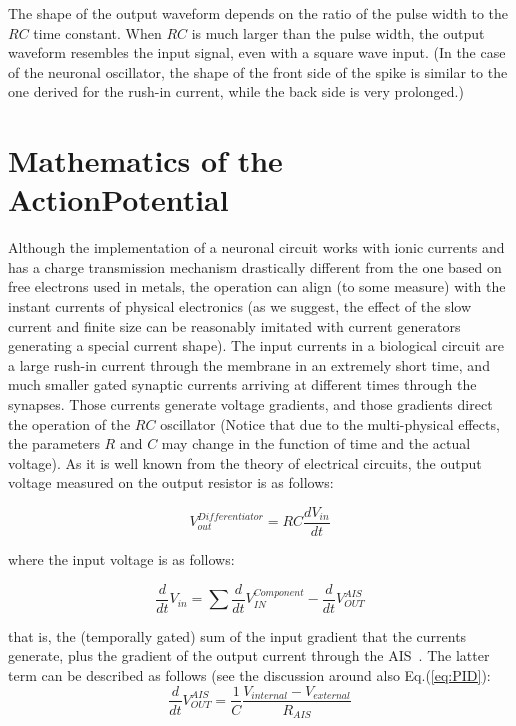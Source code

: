 The shape of the output waveform depends on the ratio of the pulse width to the $RC$ time constant. When $RC$ is much larger than the pulse width, the output waveform resembles the input signal, even with a square wave input. (In the case of the neuronal oscillator, the shape of the front side of the spike is similar to the one derived for the rush-in current, while the back side is very prolonged.)


\section{Mathematics of the ActionPotential\label{sec:MathematicsAP}}

Although the implementation of a neuronal circuit works with ionic
currents and has a charge transmission mechanism drastically different
from the one based on free electrons used in metals, the operation
can align (to some measure) with the instant currents of physical
electronics (as we suggest, the effect of the slow current and finite
size can be reasonably imitated with current generators generating
a special current shape). The input currents in a biological circuit
are a large rush-in current through the membrane in an extremely short
time, and much smaller gated synaptic currents arriving at different
times through the synapses. Those currents generate voltage gradients,
and those gradients direct the operation of the $RC$ oscillator
(Notice that due to the multi-physical effects, the parameters $R$ and $C$ may change in the function of time and the actual voltage).
As it is well known from the theory of electrical circuits, the output
voltage measured on the output resistor is as follows:

\begin{equation}
	V_{out}^{Differentiator}=RC\frac{dV_{in}}{dt}\label{eq:RC_Circuit_Output}
\end{equation}

\noindent where the input voltage is as follows:

\begin{equation}
	\frac{d}{dt}V_{in}=\sum\frac{d}{dt}V_{IN}^{Component}-\frac{d}{dt}V_{OUT}^{AIS}\label{eq:RC_Circuit_Input}
\end{equation}

\noindent that is, the (temporally gated) sum of the input gradient
that the currents generate, plus the gradient of the output current
through the \gls{AIS}~\cite{AISStructureReview:2018,AIS_Updated_Viewpoint:2018}.
The latter term can be described as follows (see the discussion around also Eq.(\ref{eq:PID}):
\begin{equation}
	\frac{d}{dt}V_{OUT}^{AIS}={\frac{1}{C}}\frac{V_{internal}-V_{external}}{R_{AIS}}\label{eq:AIS_Voltage}
\end{equation}


